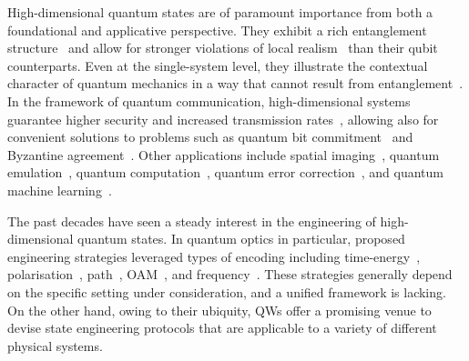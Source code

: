 High-dimensional quantum states are of paramount importance from both a foundational and applicative perspective. They exhibit a rich entanglement structure~\cite{horodecki2009quantum} and allow for stronger violations of local realism~\cite{vértesi2010closing,brunner2014bell, lapkiewicz2011experimental} than their qubit counterparts. Even at the single-system level, they illustrate the contextual character of quantum mechanics in a way that cannot result from entanglement~\cite{klyachko2008simple,lapkiewicz2011experimental}. 
In the framework of quantum communication, high-dimensional systems guarantee higher security and increased transmission rates~\cite{bechmannpasquinucci2000quantum, cerf2002security, bru2002optimal, acin2003security, karimipour2002quantum, durt2004security, nunn2013largealphabet, mower2013highdimensional, lee2014entanglementbased, zhong2015photonefficient}, allowing also for convenient solutions to problems such as quantum bit commitment~\cite{langford2004measuring} and  Byzantine agreement~\cite{fitzi2001quantum}.
Other applications include spatial imaging~\cite{howland2013efficient}, quantum emulation~\cite{buluta2009quantum,neeley2009emulation}, quantum computation~\cite{bartlett2002quantum, ralph2007efficient,lanyon2008simplifying,campbell2012magicstate,campbell2014enhanced}, quantum error correction~\cite{chuang1997bosonic,duclos-cianci2013kitaev,michael2016class}, and quantum machine learning~\cite{paparo2014quantum}.

The past decades have seen a steady interest in the engineering of high-dimensional quantum states. %
In quantum optics in particular, proposed engineering strategies leveraged types of encoding including time-energy~\cite{thew2004belltype, bessire2014versatile}, polarisation~\cite{bogdanov2004qutrit}, path~\cite{osullivanhale2005pixel,hu2020experimental}, \ac{OAM}~\cite{mair2001entanglement, mclaren2012entangled, krenn2013entangled, krenn2014generation, zhang2016engineering}, and frequency~\cite{bernhard2013shaping, jin2016simple}. These strategies generally depend on the specific setting under consideration, and a unified framework is lacking. 
On the other hand, owing to their ubiquity, QWs offer a promising venue to devise state engineering protocols that are applicable to a variety of different physical systems.

